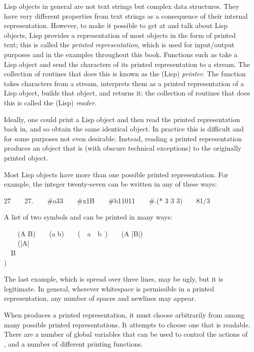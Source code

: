 Lisp objects in general are not text strings but complex data structures.
They have very different properties from text strings as a consequence of
their internal representation.  However, to make it possible to get at
and talk about Lisp objects, Lisp provides a representation of
most objects in the form of printed text; this is called the \emph{printed
representation}, which is used for input/output purposes and in the
examples throughout this book.  Functions such as  take a
Lisp object and send the characters of its printed representation to a
stream.  The collection of routines that does this is known as the
(Lisp) \emph{printer}.  The  function takes characters from a
stream, interprets them as a printed representation of a Lisp object,
builds that object, and returns it; the collection of routines
that does this is called the (Lisp) \emph{reader}.

Ideally, one could print a Lisp object and then read the printed
representation back in, and so obtain the same identical object.
In practice this is difficult and for some purposes not even desirable.
Instead, reading a printed representation produces an object
that is (with obscure technical exceptions)
 to the originally printed object.

Most Lisp objects have more than one possible printed representation.
For example, the integer twenty-seven can be written in any of these ways:
\begin{lisp}
27~~~~27.~~~~\#o33~~~~\#x1B~~~~\#b11011~~~~\#.(* 3 3 3)~~~~81/3
\end{lisp}
A list of two symbols  and  can be printed in many ways:
\begin{lisp}
~~~~(A B)~~~~(a b)~~~~(~~a~~b~)~~~~({\Xbackslash}A |B|) \\
~~~~(|{\Xbackslash}A| \\
~~B \\
)
\end{lisp}
The last example, which is spread over three lines, may be ugly, but it
is legitimate.  In general, wherever whitespace is permissible in a printed
representation, any number of spaces and newlines may appear.

When  produces a printed representation, it must choose arbitrarily
from among many possible printed representations.  It attempts to choose
one that is readable.  There are a number of global variables that can
be used to control the actions of , and a number of different
printing functions.

